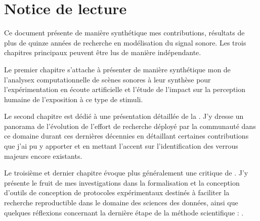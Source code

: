 \chapter{\nmu Notice \nmu de lecture} \label{chap:notice}

Ce document présente de manière synthétique mes contributions, résultats de plus de quinze années de recherche en modélisation du signal sonore. Les trois chapitres principaux peuvent être lus de manière indépendante.

Le premier chapitre s'attache à présenter de manière synthétique mon  de l'analysex computationnelle de scènes sonores à leur synthèse pour l'expérimentation en écoute artificielle et l'étude de l'impact sur la perception humaine de l'exposition à ce type de stimuli.

Le second chapitre est dédié à une présentation détaillée de la . J'y dresse un panorama de l'évolution de l'effort de recherche déployé par la communauté dans ce domaine durant ces dernières décennies en détaillant certaines contributions que j'ai pu y apporter et en mettant l'accent sur l'identification des verrous majeurs encore existants.

Le troisième et dernier chapitre évoque plus généralement une critique de . J'y présente le fruit de mes investigations dans la formalisation et la conception d'outils de conception de protocoles expérimentaux destinés à faciliter la recherche reproductible dans le domaine des sciences des données, ainsi que quelques réflexions concernant la dernière étape de la méthode scientifique : .

